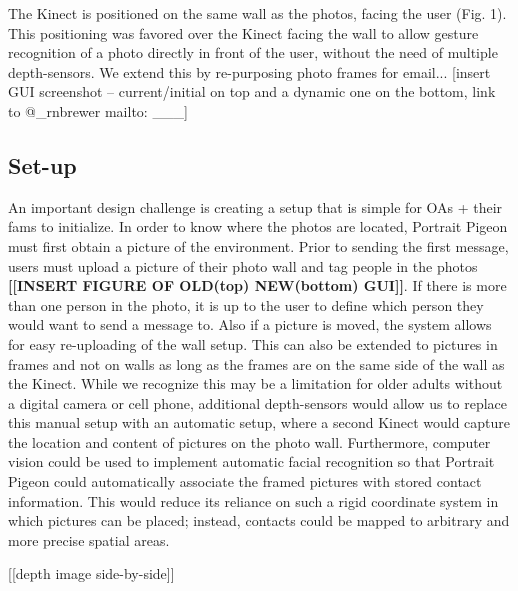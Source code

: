\documentclass{chi-ext}
\begin{document}
The Kinect is positioned on the same wall as the photos, facing the user (Fig. 1). This positioning was favored over the Kinect facing the wall to allow gesture recognition of a photo directly in front of the user, without the need of multiple depth-sensors. We extend this by re-purposing photo frames for email... [insert GUI screenshot -- current/initial on top and a dynamic one on the bottom, link to @_rnbrewer mailto: ___]

\subsection{Set-up}
An important design challenge is creating a setup that is simple for OAs + their fams to initialize. In order to know where the photos are located, Portrait Pigeon  must first obtain a picture of the environment. Prior to sending the first message, users must upload a picture of their photo wall and tag people in the photos \textbf{[[INSERT FIGURE OF OLD(top) NEW(bottom) GUI]]}. If there is more than one person in the photo, it is up to the user to define which person they would want to send a message to. Also if a picture is moved, the system allows for easy re-uploading of the wall setup. This can also be extended to pictures in frames and not on walls as long as the frames are on the same side of the wall as the Kinect. While we recognize this may be a limitation for older adults without a digital camera or cell phone, additional depth-sensors would allow us to replace this manual setup with an automatic setup, where a second Kinect would capture the location and content of pictures on the photo wall. Furthermore, computer vision could be used to implement automatic facial recognition so that Portrait Pigeon could automatically associate the framed pictures with stored contact information. This would reduce its reliance on such a rigid coordinate system in which pictures can be placed; instead, contacts could be mapped to arbitrary and more precise spatial areas.

[[depth image side-by-side]]
\end{document}
